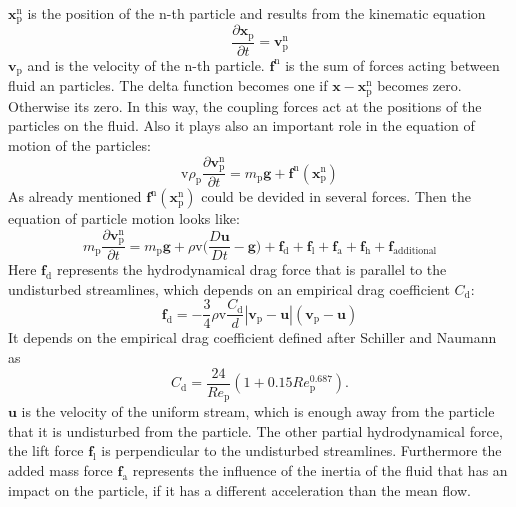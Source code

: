 \documentclass[a4paper,12pt]{article}
\renewcommand*\vec[1]{\boldsymbol{#1}}
\numberwithin{equation}{section} %
\begin{document}
$\vec{x}_\mathrm{p}^\mathrm{n} $ is the position of the n-th particle and results from the kinematic equation 
\begin{equation}
 \frac{\partial{\vec{x}_\mathrm{p}}}{\partial{t}} = \vec{v}_\mathrm{p}^\mathrm{n}
\end{equation}
$\vec{v}_\mathrm{p}$ and is the velocity of the n-th particle.
$\vec{f}^\mathrm{n}$ is the sum of forces acting between fluid an particles.
The delta function becomes one if $\vec{x}-\vec{x}_\mathrm{p}^\mathrm{n}$ becomes zero. Otherwise its zero. In this way, the coupling forces act at the positions of the particles on the fluid. 
Also it plays also an important role in the equation of motion of the particles:
\begin{equation}
\mathrm{v} \rho_\mathrm{p} \frac{\partial{\vec{v}_\mathrm{p}^\mathrm{n}}}{\partial{t}} = m_\mathrm{p}\vec{g}+\vec{f}^\mathrm{n}(\vec{x}_\mathrm{p}^\mathrm{n})
\end{equation}
As already mentioned $\vec{f}^\mathrm{n}(\vec{x}_\mathrm{p}^\mathrm{n})$ could be devided in several forces. Then the equation of particle motion looks like:
\begin{equation}
m_\mathrm{p} \frac{\partial{\vec{v}_\mathrm{p}^\mathrm{n}}}{\partial{t}} = m_\mathrm{p}\vec{g}+\rho \mathrm{v}\biggl(\frac{D\vec{u}}{Dt}-\vec{g} \biggl)+\vec{f}_\mathrm{d}+\vec{f}_\mathrm{l}+\vec{f}_\mathrm{a}+\vec{f}_\mathrm{h}+\vec{f}_\mathrm{additional}
\end{equation}
Here $\vec{f}_\mathrm{d}$ represents the hydrodynamical drag force that is parallel to the undisturbed streamlines, which depends on an empirical drag coefficient $C_{\mathrm{d}} $:
\begin{equation}
\vec{f}_\mathrm{d}=-\frac{3}{4}\rho \mathrm{v} \frac{C_\mathrm{d}}{d}|\vec{v}_\mathrm{p}-\vec{u}|(\vec{v}_\mathrm{p}-\vec{u})
\end{equation}
It depends on the empirical drag coefficient defined after Schiller and Naumann as
\begin{equation}
C_\mathrm{d} = \frac{24}{Re_\mathrm{p}}(1+0.15Re_\mathrm{p}^\mathrm{0.687}).
\end{equation}
$\vec{u}$ is the velocity of the uniform stream, which is enough away from the particle that it is undisturbed from the particle.
The other partial hydrodynamical force, the lift force $\vec{f}_\mathrm{l}$ is perpendicular to the undisturbed streamlines.
Furthermore the added mass force $\vec{f}_\mathrm{a}$ represents the influence of the inertia of the fluid that has an impact on the particle, if it has a different acceleration than the mean flow.
\end{document}
